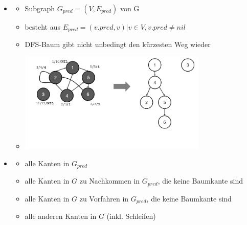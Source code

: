 \documentclass[
    12pt,
    a4paper,
    ngerman,
    color=3b,%
    marginpar=false,
    colorback=false,
    leqno,
]{tudaexercise}
\begin{document}
\begin{itemize}
        \item {}
            \begin{itemize}
                \item Subgraph $G_{pred}=(V,E_{pred})$ von G
                \item besteht aus $E_{pred} = {(v.pred,v)|v \in V, v.pred \neq nil}$
                \item DFS-Baum gibt nicht unbedingt den kürzesten Weg wieder
                \item[] \includegraphics[width=9cm]{pictures/dfswald.PNG}
            \end{itemize}
        \vspace*{-2cm}
        \item {}
            \begin{itemize}
                \item {} alle Kanten in $G_{pred}$
                \item {} alle Kanten in $G$ zu Nachkommen in $G_{pred}$, die keine Baumkante sind
                \item {} alle Kanten in $G$ zu Vorfahren in $G_{pred}$, die keine Baumkante sind
                \item {} alle anderen Kanten in $G$ (inkl. Schleifen)
            \end{itemize}


\end{itemize}
\end{document}
